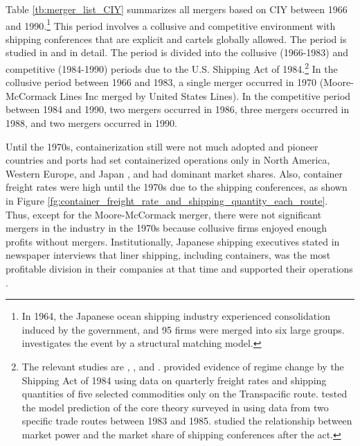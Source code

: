 \documentclass[10pt]{article}
\begin{document}
Table \ref{tb:merger_list_CIY} summarizes all mergers based on CIY between 1966 and 1990.\footnote{In 1964, the Japanese ocean shipping industry experienced consolidation induced by the government, and 95 firms were merged into six large groups. \cite{otani2021estimating} investigates the event by a structural matching model.}
This period involves a collusive and competitive environment with shipping conferences that are explicit and cartels globally allowed. 
The period is studied in \cite{matsuda2022unified} and \cite{otani2023industry} in detail.
The period is divided into the collusive (1966-1983) and competitive (1984-1990) periods due to the U.S. Shipping Act of 1984.\footnote{The relevant studies are \cite{wilson1991some}, \cite{pirrong1992application}, and \cite{clyde1998market}. \cite{wilson1991some} provided evidence of regime change by the Shipping Act of 1984 using data on quarterly freight rates and shipping quantities of five selected commodities only on the Transpacific route. \cite{pirrong1992application} tested the model prediction of the core theory surveyed in \cite{sjostrom2013competition} using data from two specific trade routes between 1983 and 1985. \cite{clyde1998market} studied the relationship between market power and the market share of shipping conferences after the act. }
In the collusive period between 1966 and 1983, a single merger occurred in 1970 (Moore-McCormack Lines Inc merged by United States Lines). %
In the competitive period between 1984 and 1990, two mergers occurred in 1986, three mergers occurred in 1988, and two mergers occurred in 1990. 

Until the 1970s, containerization still were not much adopted and pioneer countries and ports had set containerized operations only in North America, Western Europe, and Japan \citep{GUERRERO2014151}, and had dominant market shares. Also, container freight rates were high until the 1970s due to the shipping conferences, as shown in Figure \ref{fg:container_freight_rate_and_shipping_quantity_each_route}.
Thus, except for the Moore-McCormack merger, there were not significant mergers in the industry in the 1970s because collusive firms enjoyed enough profits without mergers. Institutionally, Japanese shipping executives stated in newspaper interviews that liner shipping, including containers, was the most profitable division in their companies at that time and supported their operations \citep{sato2006}. 
\end{document}

